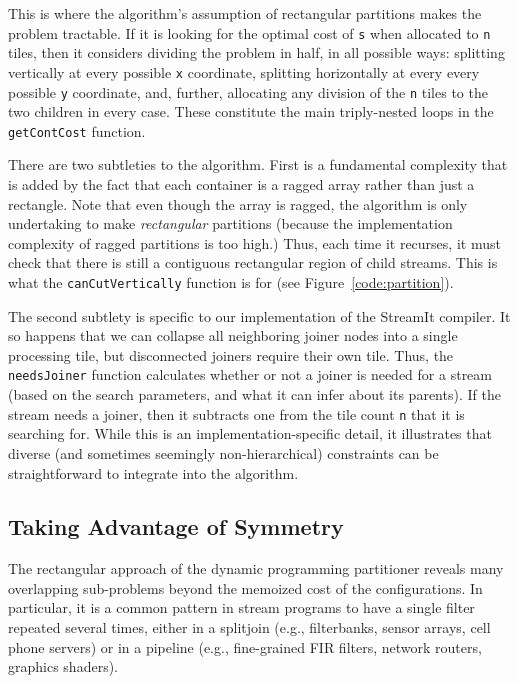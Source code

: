 This is where the algorithm's assumption of rectangular partitions
makes the problem tractable.  If it is looking for the optimal cost of
{\tt s} when allocated to {\tt n} tiles, then it considers dividing
the problem in half, in all possible ways: splitting vertically at
every possible {\tt x} coordinate, splitting horizontally at every
every possible {\tt y} coordinate, and, further, allocating any
division of the {\tt n} tiles to the two children in every case.
These constitute the main triply-nested loops in the {\tt getContCost}
function.

There are two subtleties to the algorithm.  First is a fundamental
complexity that is added by the fact that each container is a ragged
array rather than just a rectangle.  Note that even though the array
is ragged, the algorithm is only undertaking to make {\it rectangular}
partitions (because the implementation complexity of ragged partitions
is too high.)  Thus, each time it recurses, it must check that there
is still a contiguous rectangular region of child streams.  This is
what the {\tt canCutVertically} function is for (see
Figure~\ref{code:partition}).

The second subtlety is specific to our implementation of the StreamIt
compiler.  It so happens that we can collapse all neighboring joiner
nodes into a single processing tile, but disconnected joiners require
their own tile.  Thus, the {\tt needsJoiner} function calculates
whether or not a joiner is needed for a stream (based on the search
parameters, and what it can infer about its parents).  If the stream
needs a joiner, then it subtracts one from the tile count {\tt n} that
it is searching for.  While this is an implementation-specific detail,
it illustrates that diverse (and sometimes seemingly non-hierarchical)
constraints can be straightforward to integrate into the algorithm.

\subsection{Taking Advantage of Symmetry}

The rectangular approach of the dynamic programming partitioner
reveals many overlapping sub-problems beyond the memoized cost of the
configurations.  In particular, it is a common pattern in stream
programs to have a single filter repeated several times, either in a
splitjoin (e.g., filterbanks, sensor arrays, cell phone servers) or in
a pipeline (e.g., fine-grained FIR filters, network routers, graphics
shaders).  

